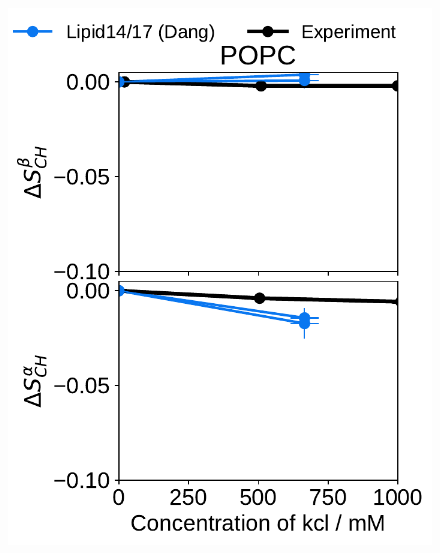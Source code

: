 \begin{figure}[htb!] 
  \centering 
  \includegraphics[width=\figwidth]{../img/ecc_pops/l17/order_parameters_changes_A-B_POPC_kcl.pdf} 

\end{figure}
